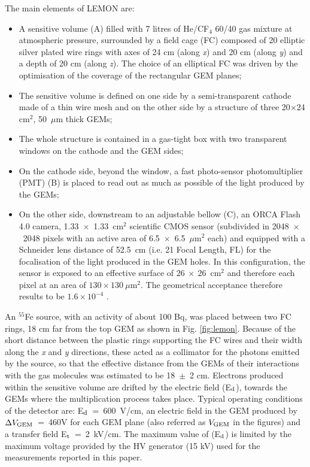 \documentclass[a4paper]{jpconf}
\begin{document}
The main elements of LEMON are:
\begin{itemize}
    \item A sensitive volume (A) filled with 7 litres of He/CF$_4$
      60/40 gas mixture at atmospheric pressure, surrounded by a field
      cage (FC) composed of 20 elliptic silver plated wire rings with
      axes of 24 cm (along {\it x}) and 20 cm (along {\it y}) and a
      depth of 20 cm (along {\it z}). The choice of an elliptical FC
      was driven by the optimisation of the coverage of the
      rectangular GEM planes;
    \item The sensitive volume is defined on one side by a
      semi-transparent cathode made of a thin wire mesh and on the
      other side by a structure of three 20$\times$24 cm$^2$,
      50~$\mu$m thick GEMs;
    \item The whole structure is contained in a gas-tight box with two
      transparent windows on the cathode and the GEM sides;
    \item On the cathode side, beyond the window, a fast photo-sensor
      photomultiplier (PMT)
      (B) is placed to read out as much as possible of the light
      produced by the GEMs;
    \item On the other side, downstream to an adjustable bellow (C),
      an ORCA Flash 4.0 camera,
      1.33~$\times$~1.33~cm$^2$ scientific CMOS sensor (subdivided in
      2048~$\times$~2048 pixels with an active area of
      6.5~$\times$~6.5~$\mu$m$^2$ each) and equipped with a Schneider
      lens
      distance of 52.5~cm (i.e. 21 Focal Length, FL) for the
      focalisation of the light produced in the GEM holes. In this
      configuration, the sensor is exposed to an effective surface of
      $26~\times~26$~cm$^2$ and therefore each pixel at an area of
      $130 \times 130~\mu$m$^2$. The geometrical acceptance therefore
      results to be $1.6 \times 10^{-4}$ \cite{bib:ieee_orange}.
\end{itemize}

An $^{55}$Fe source, with an activity of about 100 Bq, was placed
between two FC rings, 18 cm far from the top GEM as shown in
Fig. \ref{fig:lemon}.  Because of the short distance between the
plastic rings supporting the FC wires and their width along the {\it
  x} and {\it y} directions, these acted as a collimator for the
photons emitted by the source, so that the effective distance from the
GEMs of their interactions with the gas molecules was estimated to be
18~$\pm$~2 cm. Electrons produced within the sensitive volume are
drifted by the electric field (E$_{\rm d}$), towards the GEMs where the
multiplication process takes place. Typical operating conditions of
the detector are: E$_{\rm d}$~=~600~V/cm, an electric field in the GEM
produced by $\Delta V_{\rm GEM}$~=~460V for each GEM plane (also
referred as $V_{\rm GEM}$ in the figures) and a transfer field E$_{\rm
  t}$~=~2~kV/cm. The maximum value of (E$_{\rm d}$) is limited by the
maximum voltage provided by the HV generator (15 kV) used for the
measurements reported in this paper.
\end{document}

